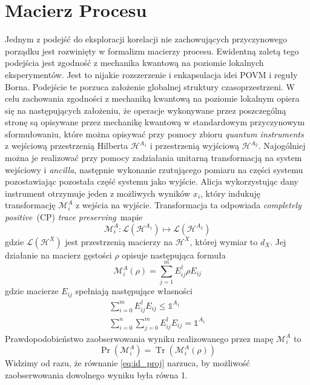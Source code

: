 \documentclass[10pt]{article} %
\DeclareMathOperator{\Trs}{Tr}
\newcommand{\Mats}[1]{\mathcal{L}(#1)}
\newcommand{\Hx}[1]{\mathcal{H}^{#1}}
\newcommand{\LHx}[1]{\Mats{\Hx{#1}}}
\newcommand{\MXi}[3]{\mathcal{M}^{#1}_{#2}(#3)}
\newcommand{\MXin}[2]{\mathcal{M}^{#1}_{#2}}
\newcommand{\MAin}[0]{\MXin{A}{i}}
\newcommand{\MAi}[1]{\MXi{A}{i}{#1}}
\newcommand{\MAir}{\MAi{\rho}}
\newcommand{\Idx}[1]{\mathbb{1}^{#1}}
\newcommand{\Tr}[1]{\Trs(#1)}
\newcommand{\Pro}[1]{\Pr(#1)}
\newcommand{\CP}{\textit{completely positive}}
\newcommand{\TP}{\textit{trace preserving}}
\begin{document}
\section{Macierz Procesu}
Jednym z podejść do eksploracji korelacji nie zachowujących przyczynowego porządku jest rozwinięty w \cite{process_matrix} formalizm macierzy procesu.
Ewidentną zaletą tego podejścia jest zgodność z mechanika kwantową na poziomie lokalnych eksperymentów. Jest to nijakie rozszerzenie i enkapsulacja idei POVM i reguły Borna. Podejście te porzuca założenie globalnej struktury czasoprzestrzeni. W celu zachowania zgodności z mechaniką kwantową na poziomie lokalnym opiera się na następujących założeniu, że operacje wykonywane przez poszczególną stronę są opisywane przez mechanikę kwantową w standardowym przyczynowym sformułowaniu, które można opisywać przy pomocy zbioru \textit{quantum instruments} \cite{quantum_instrument} z wejściową przestrzenią Hilberta $\mathcal{H}^{A_1}$ i przestrzenią wyjściową  $\mathcal{H}^{A_2}$. Najogólniej można je realizować przy pomocy zadziałania unitarną transformacją na system wejściowy i \textit{ancilla}, następnie wykonanie rzutującego pomiaru na części systemu pozostawiając pozostała część systemu jako wyjście. Alicja wykorzystując dany instrument otrzymuje jeden z możliwych wyników $x_i$, który indukuję transformację $\mathcal{M}^A_i$ z wejścia na wyjście. Transformacja ta odpowiada \CP~(CP) \TP~mapie
\begin{equation}
\mathcal{M}^A_i : \mathcal{L}(\mathcal{H}^{A_1}) \mapsto \mathcal{L}(\mathcal{H}^{A_2})
\end{equation}
gdzie $\LHx{X}$ jest przestrzenią macierzy na $\Hx{X}$, której wymiar to $d_X$. Jej działanie na macierz gęstości $\rho$ opisuje następująca formuła
\begin{equation}
\label{yolo}
\MAi{\rho} = \sum^m_{j=1} E_{ij} ^\dag \rho E_{ij}
\end{equation}
gdzie macierze $E_{ij}$ spełniają następujące własności 
\begin{gather}
\sum^m_{i=0} E_{ij}^\dag E_{ij} \leq \Idx{A_1} \\
\label{eq:id_proj} 
\sum^n_{i=0} \sum^m_{j=0} E_{ij}^\dag E_{ij} = \Idx{A_1}
\end{gather}
Prawdopodobieństwo zaobserwowania wyniku realizowanego przez mapę $\MAin$ to
\begin{equation}
\Pro{\MAin} = \Tr{\MAir}
\end{equation}
Widzimy od razu, że równanie \eqref{eq:id_proj} narzuca, by możliwość zaobserwowania dowolnego wyniku była równa 1.
\end{document}
